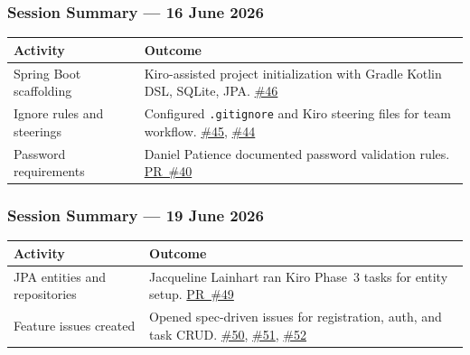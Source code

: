 \subsubsection{Session Summary --- 16 June 2026}
\begin{tabularx}{\textwidth}{@{} l X @{}}
  \toprule
  \textbf{Activity} & \textbf{Outcome} \\
  \midrule
  Spring Boot scaffolding & Kiro-assisted project initialization with Gradle Kotlin DSL, SQLite, JPA.
    \href{https://github.com/JaehoonSong12/PEP-Team02-TheDJs/issues/46}{\#46} \\
  Ignore rules and steerings & Configured \texttt{.gitignore} and Kiro steering files for team workflow.
    \href{https://github.com/JaehoonSong12/PEP-Team02-TheDJs/issues/45}{\#45},
    \href{https://github.com/JaehoonSong12/PEP-Team02-TheDJs/issues/44}{\#44} \\
  Password requirements & Daniel Patience documented password validation rules.
    \href{https://github.com/JaehoonSong12/PEP-Team02-TheDJs/pull/40}{PR~\#40} \\
  \bottomrule
\end{tabularx}

\subsubsection{Session Summary --- 19 June 2026}
\begin{tabularx}{\textwidth}{@{} l X @{}}
  \toprule
  \textbf{Activity} & \textbf{Outcome} \\
  \midrule
  JPA entities and repositories & Jacqueline Lainhart ran Kiro Phase~3 tasks for entity setup.
    \href{https://github.com/JaehoonSong12/PEP-Team02-TheDJs/pull/49}{PR~\#49} \\
  Feature issues created & Opened spec-driven issues for registration, auth, and task CRUD.
    \href{https://github.com/JaehoonSong12/PEP-Team02-TheDJs/issues/50}{\#50},
    \href{https://github.com/JaehoonSong12/PEP-Team02-TheDJs/issues/51}{\#51},
    \href{https://github.com/JaehoonSong12/PEP-Team02-TheDJs/issues/52}{\#52} \\
  \bottomrule
\end{tabularx}

